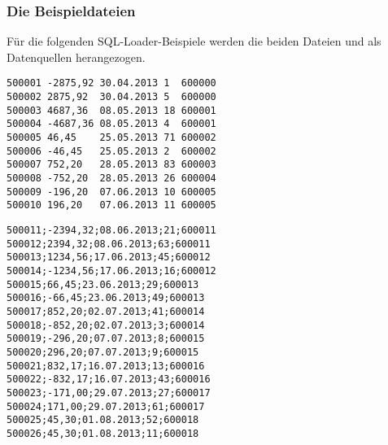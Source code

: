         \subsubsection{Die Beispieldateien}
          F\"ur die folgenden SQL-Loader-Beispiele werden die beiden Dateien  und  als Datenquellen herangezogen.
          \begin{lstlisting}[caption={Die Datei \oscommand{buchungen\_fix.csv}},label=admin920,language=terminal]
500001 -2875,92 30.04.2013 1  600000
500002 2875,92  30.04.2013 5  600000
500003 4687,36  08.05.2013 18 600001
500004 -4687,36 08.05.2013 4  600001
500005 46,45    25.05.2013 71 600002
500006 -46,45   25.05.2013 2  600002
500007 752,20   28.05.2013 83 600003
500008 -752,20  28.05.2013 26 600004
500009 -196,20  07.06.2013 10 600005
500010 196,20   07.06.2013 11 600005
          \end{lstlisting}
          \begin{lstlisting}[caption={Die Datei \oscommand{buchungen\_var.csv}},label=admin920a,language=terminal]
500011;-2394,32;08.06.2013;21;600011
500012;2394,32;08.06.2013;63;600011
500013;1234,56;17.06.2013;45;600012
500014;-1234,56;17.06.2013;16;600012
500015;66,45;23.06.2013;29;600013
500016;-66,45;23.06.2013;49;600013
500017;852,20;02.07.2013;41;600014
500018;-852,20;02.07.2013;3;600014
500019;-296,20;07.07.2013;8;600015
500020;296,20;07.07.2013;9;600015
500021;832,17;16.07.2013;13;600016
500022;-832,17;16.07.2013;43;600016
500023;-171,00;29.07.2013;27;600017
500024;171,00;29.07.2013;61;600017
500025;45,30;01.08.2013;52;600018
500026;45,30;01.08.2013;11;600018
          \end{lstlisting}
